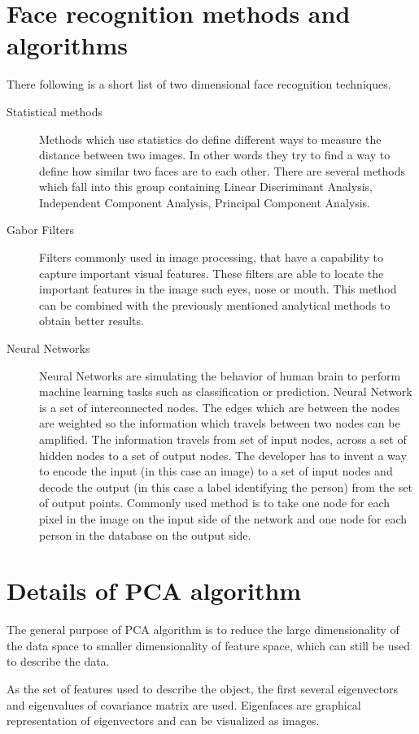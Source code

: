 \section{Face recognition methods and algorithms}
\label{tech:face_recognition}
There following is a short list of two dimensional face recognition techniques\cite{Patil10}.
\begin{description}
	\item [Statistical methods] Methods which use statistics do define different ways to measure the distance between two images. In other words they try to find a way to define how similar two faces are to each other. There are several methods which fall into this group containing Linear Discriminant Analysis, Independent Component Analysis, Principal Component Analysis.
	\item [Gabor Filters] Filters commonly used in image processing, that have a capability to capture important visual features. These filters are able to locate the important features in the image such eyes, nose or mouth. This method can be combined with the previously mentioned analytical methods to obtain better results.
	\item [Neural Networks] Neural Networks are simulating the behavior of human brain to perform machine learning tasks such as classification or prediction. Neural Network is a set of interconnected nodes. The edges which are between the nodes are weighted so the information which travels between two nodes can be amplified. The information travels from set of input nodes, across a set of hidden nodes to a set of output nodes. The developer has to invent a way to encode the input (in this case an image) to a set of input nodes and decode the output (in this case a label identifying the person) from the set of output points.
	Commonly used method is to take one node for each pixel in the image on the input side of the network and one node for each person in the database on the output side.
\end{description}

\section{Details of PCA algorithm}
\label{tech:eigenface}
The general purpose of PCA algorithm is to reduce the large dimensionality of the data space to smaller dimensionality of feature space, which can still be used to describe the data.

As the set of features used to describe the object, the first several eigenvectors and eigenvalues of covariance matrix are used. Eigenfaces are graphical representation of eigenvectors and can be visualized as images.

